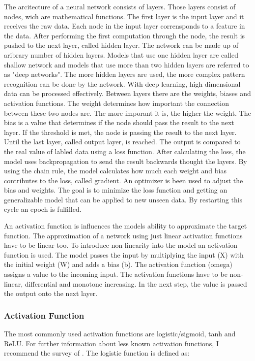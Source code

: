 The arcitecture of a neural network consists of layers. 
Those layers consist of nodes, wich are mathematical functions.
The first layer is the input layer and it receives the raw data. 
Each node in the input layer corrensponds to a feature in the data.
After performing the first computation through the node, the result is pushed to the next layer, called hidden layer.
The network can be made up of aribrary number of hidden layers. 
Models that use one hidden layer are called shallow network and models that use more than two hidden layers are referred to as "deep networks".
The more hidden layers are used, the more complex pattern recognition can be done by the network.
With deep learning, high dimensional data can be processed effectively.
Between layers there are the weights, biases and activation functions. 
The weight determines how important the connection between these two nodes are. 
The more imporant it is, the higher the weight. 
The bias is a value that determines if the node should pass the result to the next layer. 
If the threshold is met, the node is passing the result to the next layer.
Until the last layer, called  output layer, is reached.
The output is compared to the real value of labled data using a loss function. 
After calculating the loss, the model uses backpropagation to send the result backwards thought the layers.  
By using the chain rule, the model calculates how much each weight and bias contributes to the loss, called gradient.
An optimizer is been used to adjust the bias and weights. 
The goal is to minimize the loss function and getting an generalizable model that can be applied to new unseen data.
By restarting this cycle an epoch is fulfilled. 



An activation function is influences the models ability to approximate the target function.
The approximation of a network using just linear activation functions have to be linear too.
To introduce non-linearity into the model an activation function is used. 
The model passes the input by multiplying the input (X) with the initial weight (W) and adds a bias (b). 
The activation function (omega) assigns a value to the incoming input.
The activation functions have to be non-linear, differential and monotone increasing. 
In the next step, the value is passed the output onto the next layer.


\subsubsection*{Activation Function}
The most commonly used activation functions are logistic/sigmoid, tanh and ReLU.
For further information about less known activation functions, I recommend the survey of \citep{nwankpa2018activation}. 
The logistic function is defined as: 


